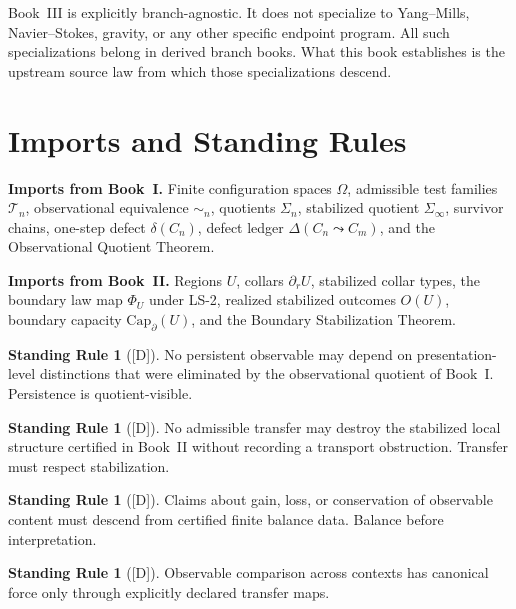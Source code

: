\documentclass[12pt,oneside]{amsbook}
\theoremstyle{plain}
\theoremstyle{definition}
\newtheorem{standingrule}[theorem]{Standing Rule}
\theoremstyle{remark}
\newcommand{\status}[1]{\textup{[#1]}}
\begin{document}
Book~III is explicitly branch-agnostic.  It does not specialize to
Yang--Mills, Navier--Stokes, gravity, or any other specific endpoint
program.  All such specializations belong in derived branch books.
What this book establishes is the upstream source law from which those
specializations descend.

\section{Imports and Standing Rules}

\textbf{Imports from Book~I.}  Finite configuration spaces $\Omega$,
admissible test families $\mathcal{T}_n$, observational equivalence
$\sim_n$, quotients $\Sigma_n$, stabilized quotient $\Sigma_\infty$,
survivor chains, one-step defect $\delta(C_n)$, defect ledger
$\Delta(C_n \leadsto C_m)$, and the Observational Quotient Theorem.

\textbf{Imports from Book~II.}  Regions $U$, collars $\partial_r U$,
stabilized collar types, the boundary law map $\Phi_U$ under LS-2,
realized stabilized outcomes $O(U)$, boundary capacity
$\mathrm{Cap}_\partial(U)$, and the Boundary Stabilization Theorem.

\begin{standingrule}[\status{D}]\label{sr:quotient-visible}
No persistent observable may depend on presentation-level distinctions
that were eliminated by the observational quotient of Book~I.
Persistence is quotient-visible.
\end{standingrule}

\begin{standingrule}[\status{D}]\label{sr:transfer-respects-stab}
No admissible transfer may destroy the stabilized local structure
certified in Book~II without recording a transport obstruction.
Transfer must respect stabilization.
\end{standingrule}

\begin{standingrule}[\status{D}]\label{sr:balance-before-interpretation}
Claims about gain, loss, or conservation of observable content must
descend from certified finite balance data.  Balance before
interpretation.
\end{standingrule}

\begin{standingrule}[\status{D}]\label{sr:comparison-through-maps}
Observable comparison across contexts has canonical force only through
explicitly declared transfer maps.
\end{standingrule}
\end{document}

